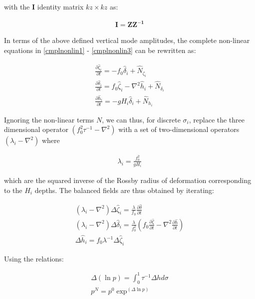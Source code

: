 with the $\bm{I}$ identity matrix $kz\times kz$ as:

\begin{gather}
  \bm{I} = \bm{Z}\bm{Z^{-1}}
\end{gather}

In terms of the above defined vertical mode amplitudes, the complete
non-linear equations in \ref{cmplnonlin1} - \ref{cmplnonlin3} can be
rewritten as:

\begin{gather}
  \frac{\partial \hat{\zeta}_i}{\partial t} = - f_0 \hat{\delta}_i +
     \hat{N}_{\zeta_i} \\
  \frac{\partial \hat{\delta}_i}{\partial t} = f_0 \hat{\zeta}_i -
     \nabla^2 \hat{h}_i + \hat{N}_{\delta_i} \\
  \frac{\partial \hat{h}_i}{\partial t} = -g H_i \hat{\delta}_i +
     \hat{N}_{h_i}
\end{gather}

Ignoring the non-linear terms $N$, we can thus, for discrete $\sigma_i$,
replace the three dimensional operator $(f_0^2\tau^{-1} - \nabla^2)$ with
a set of two-dimensional operators $(\lambda_i - \nabla^2)$ where

\begin{gather}
  \lambda_i = \frac{f_0^2}{gH_i}
\end{gather}

which are the squared inverse of the Rossby radius of deformation
corresponding to the $H_i$ depths.
The balanced fields are thus obtained by iterating:

\begin{gather}
  \label{to_be_iterated1}
  \left( \lambda_i - \nabla^2 \right) \Delta \hat{\zeta}_i =
     \frac{\lambda}{f_0} \frac{\partial \hat{\delta}}{\partial t} \\
  \label{to_be_iterated2}
  \left( \lambda_i - \nabla^2 \right) \Delta \hat{\delta}_i =
     \frac{\lambda}{f_0^2} \left( f_0 
     \frac{\partial \hat{\zeta}}{\partial t} -
     \nabla^2 \frac{\partial \hat{h}}{\partial t} \right) \\
  \label{to_be_iterated3}
  \Delta \hat{h}_i = f_0 \lambda^{-1} \Delta \hat{\zeta}_i
\end{gather}

Using the relations:

\begin{gather}
  \Delta \left( \ln p\right) = \int_0^1 \tau^{-1} \Delta h d\sigma \\
  p^N = p^0 \exp^{\left( \Delta \ln p \right)}
\end{gather}

